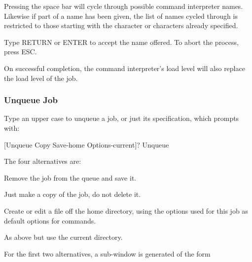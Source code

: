 Pressing the space bar will cycle through possible command interpreter
names. Likewise if part of a name has been given, the list of names
cycled through is restricted to those starting with the character or
characters already specified.

Type RETURN or ENTER to accept the name offered. To abort the process,
press ESC.

On successful completion, the command interpreter's load level will also replace the load level of the job.

\subsubsection{Unqueue Job}
Type an upper case  to unqueue a job, or just its specification, which prompts with:

\begin{expara}

[Unqueue Copy Save-home Options-current]? Unqueue

\end{expara}

The four alternatives are:


Remove the job from the queue and save it.


Just make a copy of the job, do not delete it.


Create or edit a \homeconfigpath{} file off the home
directory, using the options used for this job as default options for
\PrBtr{} commands.


As above but use the current directory.

For the first two alternatives, a sub-window is generated of the form

